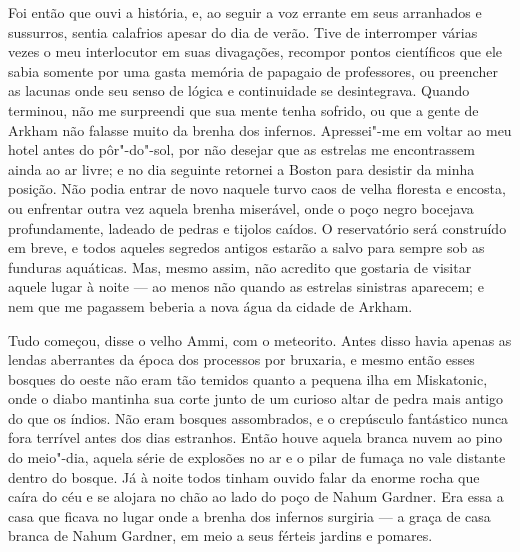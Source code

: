 Foi então que ouvi a história, e, ao seguir a voz errante em seus
arranhados e sussurros, sentia calafrios apesar do dia de verão. Tive de
interromper várias vezes o meu interlocutor em suas divagações, recompor
pontos científicos que ele sabia somente por uma gasta memória de
papagaio de professores, ou preencher as lacunas onde seu senso de
lógica e continuidade se desintegrava. Quando terminou, não me
surpreendi que sua mente tenha sofrido, ou que a gente de Arkham não
falasse muito da brenha dos infernos. Apressei"-me em voltar ao meu hotel
antes do pôr"-do"-sol, por não desejar que as estrelas me encontrassem
ainda ao ar livre; e no dia seguinte retornei a Boston para desistir da
minha posição. Não podia entrar de novo naquele turvo caos de velha
floresta e encosta, ou enfrentar outra vez aquela brenha miserável, onde
o poço negro bocejava profundamente, ladeado de pedras e tijolos caídos.
O reservatório será construído em breve, e todos aqueles segredos
antigos estarão a salvo para sempre sob as funduras aquáticas. Mas,
mesmo assim, não acredito que gostaria de visitar aquele lugar à noite
--- ao menos não quando as estrelas sinistras aparecem; e nem que me
pagassem beberia a nova água da cidade de Arkham.

Tudo começou, disse o velho Ammi, com o meteorito. Antes disso havia
apenas as lendas aberrantes da época dos processos por bruxaria, e mesmo
então esses bosques do oeste não eram tão temidos quanto a pequena ilha
em Miskatonic, onde o diabo mantinha sua corte junto de um curioso altar
de pedra mais antigo do que os índios. Não eram bosques assombrados, e o
crepúsculo fantástico nunca fora terrível antes dos dias estranhos.
Então houve aquela branca nuvem ao pino do meio"-dia, aquela série de
explosões no ar e o pilar de fumaça no vale distante dentro do bosque.
Já à noite todos tinham ouvido falar da enorme rocha que caíra do céu e
se alojara no chão ao lado do poço de Nahum Gardner. Era essa a casa que
ficava no lugar onde a brenha dos infernos surgiria --- a graça de casa
branca de Nahum Gardner, em meio a seus férteis jardins e pomares.

